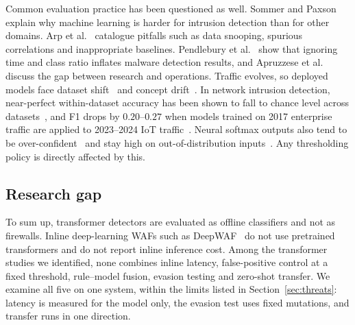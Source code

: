 \documentclass[preprint,11pt]{elsarticle}
\begin{document}
Common evaluation practice has been questioned as well. Sommer and
Paxson~\cite{sommer2010outside} explain why machine learning is harder for
intrusion detection than for other domains. Arp et
al.~\cite{arp2022dos} catalogue pitfalls such as data snooping, spurious
correlations and inappropriate baselines. Pendlebury et
al.~\cite{pendlebury2019tesseract} show that ignoring time and class ratio
inflates malware detection results, and Apruzzese et
al.~\cite{apruzzese2023role} discuss the gap between research and
operations. Traffic evolves, so deployed models face dataset
shift~\cite{quinonero2009shift} and concept
drift~\cite{gama2014drift,jordaney2017transcend}. In network intrusion
detection, near-perfect within-dataset accuracy has been shown to fall to
chance level across datasets~\cite{cantone2024crossdataset}, and F1 drops
by $0.20$--$0.27$ when models trained on 2017 enterprise traffic are
applied to 2023--2024 IoT traffic~\cite{venkatesan2026crossdataset}. Neural
softmax outputs also tend to be over-confident~\cite{guo2017calibration}
and stay high on out-of-distribution inputs~\cite{hendrycks2017baseline}.
Any thresholding policy is directly affected by this.

\subsection{Research gap}
To sum up, transformer detectors are evaluated as offline classifiers and
not as firewalls. Inline deep-learning WAFs such as
DeepWAF~\cite{kuang2019deepwaf} do not use pretrained transformers and do
not report inline inference cost. Among the transformer studies we
identified, none combines inline latency, false-positive control at a fixed
threshold, rule--model fusion, evasion testing and zero-shot transfer. We
examine all five on one system, within the limits listed in
Section~\ref{sec:threats}: latency is measured for the model only, the
evasion test uses fixed mutations, and transfer runs in one direction.
\end{document}
